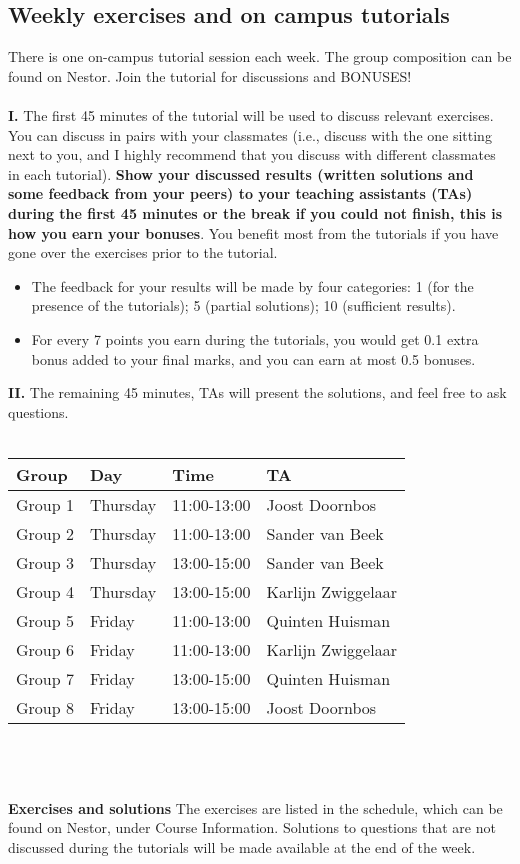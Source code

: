 \documentclass[openany]{article}
\begin{document}
\subsection{Weekly exercises and on campus tutorials}
There is one on-campus tutorial session each week. The group composition can be found on Nestor. Join the tutorial for discussions and BONUSES!\\~\\
\textbf{I.} {The first 45 minutes} of the tutorial will be used to discuss
relevant exercises. You can discuss in pairs with your classmates (i.e., discuss with the one sitting next to you, and I highly recommend that you discuss with different classmates in each tutorial). \textbf{Show your discussed results (written solutions and some feedback from your peers) to your teaching assistants (TAs) during the first 45 minutes or the break if you could not finish, this is how you earn your bonuses}. You benefit most from the tutorials if you have gone over the exercises prior to the tutorial.
\begin{itemize}
	\item The feedback for your results will be made by four categories: 1 (for the presence of the tutorials); 5 (partial solutions); 10 (sufficient results). 
	\item For every 7 points you earn during the tutorials, you would get 0.1 extra bonus added to your final marks, and you can earn at most 0.5 bonuses. 
\end{itemize}
\textbf{II.} {The remaining 45 minutes,} TAs will present the solutions, and feel free to ask questions. \\~\\
\begin{tabular}{llll} 
	Group & Day & Time & TA \\
	\hline Group 1 & Thursday & 11:00-13:00 & Joost Doornbos\\
	Group 2 & Thursday & 11:00-13:00 & Sander van Beek\\ 
	
	Group 3 & Thursday & 13:00-15:00 & Sander van Beek\\
	Group 4 & Thursday & 13:00-15:00 & Karlijn Zwiggelaar\\
	Group 5 & Friday & 11:00-13:00 & Quinten Huisman\\
	
	Group 6 & Friday & 11:00-13:00 & Karlijn Zwiggelaar \\
	Group 7 & Friday & 13:00-15:00 & Quinten Huisman\\
	Group 8 & Friday & 13:00-15:00 & Joost Doornbos\\
\end{tabular}~\\~\\~\\
\textbf{Exercises and solutions} The exercises are listed in the schedule, which
can be found on Nestor, under Course Information. Solutions to questions
that are not discussed during the tutorials will be made available at the end
of the week.
\end{document}
